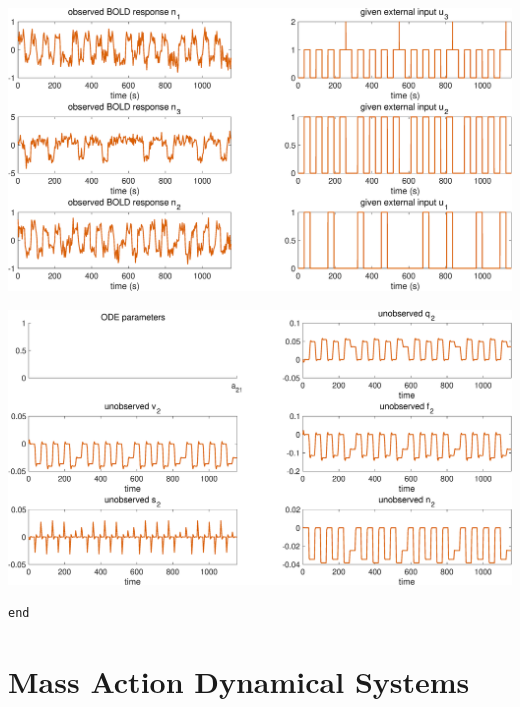 {\centering
\includegraphics [width=6in]{VGM_for_dynamic_causal_modeling_01.eps}

\includegraphics [width=6in]{VGM_for_dynamic_causal_modeling_02.eps}

}
\color{RoyalPurple}\begin{verbatim}
end
\end{verbatim} 
\color{black}


\section{Mass Action Dynamical Systems}

